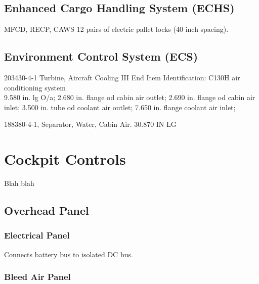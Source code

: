 \section{Enhanced Cargo Handling System (ECHS)}
\label{sec:echs}

\gls{MFCD}, \gls{RECP}, \gls{CAWS} 12 pairs of electric pallet locks (40 inch spacing).

\section{Environment Control System (ECS)}
203430-4-1 Turbine, Aircraft Cooling III End Item Identification: C130H air conditioning system\\
9.580 in. lg O/a;
2.680 in. flange od cabin air outlet;
2.690 in. flange od cabin air inlet;
3.500 in. tube od coolant air outlet;
7.650 in. flange coolant air inlet;

188380-4-1, Separator, Water, Cabin Air. 30.870 IN LG

\chapter{Cockpit Controls}

Blah blah

\section{Overhead Panel}

\subsection{Electrical Panel}

\begin{enumerate}
   Connects battery bus to isolated DC bus.
\end{enumerate}

\subsection{Bleed Air Panel}
\label{sec:bleed-air-panel}

\begin{enumerate}
\end{enumerate}

